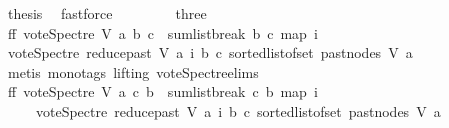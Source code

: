 \begin{isabellebody}
\ {\isacharquery}{\kern0pt}thesis\ \isamarkupfalse%
\ fastforce\isanewline
\ \ \isamarkupfalse%
\isanewline
\ \ \ \ \isamarkupfalse%
\ three\isanewline
\ \ \ \ \isamarkupfalse%
\ \isamarkupfalse%
\ ff{\isacharcolon}{\kern0pt}\ {\isachardoublequoteopen}vote{\isacharunderscore}{\kern0pt}Spectre\ V\ a\ b\ c\ {\isacharequal}{\kern0pt}\ {\isacharparenleft}{\kern0pt}sumlist{\isacharunderscore}{\kern0pt}break\ b\ c\ {\isacharparenleft}{\kern0pt}map\ {\isacharparenleft}{\kern0pt}{\isasymlambda}i{\isachardot}{\kern0pt}\isanewline
\ {\isacharparenleft}{\kern0pt}vote{\isacharunderscore}{\kern0pt}Spectre\ {\isacharparenleft}{\kern0pt}reduce{\isacharunderscore}{\kern0pt}past\ V\ a{\isacharparenright}{\kern0pt}\ i\ b\ c{\isacharparenright}{\kern0pt}{\isacharparenright}{\kern0pt}\ {\isacharparenleft}{\kern0pt}sorted{\isacharunderscore}{\kern0pt}list{\isacharunderscore}{\kern0pt}of{\isacharunderscore}{\kern0pt}set\ {\isacharparenleft}{\kern0pt}past{\isacharunderscore}{\kern0pt}nodes\ V\ a{\isacharparenright}{\kern0pt}{\isacharparenright}{\kern0pt}{\isacharparenright}{\kern0pt}{\isacharparenright}{\kern0pt}{\isachardoublequoteclose}\isanewline
\ \ \ \ \ \ \isamarkupfalse%
\ {\isacharparenleft}{\kern0pt}metis\ {\isacharparenleft}{\kern0pt}mono{\isacharunderscore}{\kern0pt}tags{\isacharcomma}{\kern0pt}\ lifting{\isacharparenright}{\kern0pt}\ vote{\isacharunderscore}{\kern0pt}Spectre{\isachardot}{\kern0pt}elims{\isacharparenright}{\kern0pt}\ \isanewline
\ \ \ \ \isamarkupfalse%
\ ff{}{\isacharcolon}{\kern0pt}\ {\isachardoublequoteopen}vote{\isacharunderscore}{\kern0pt}Spectre\ V\ a\ c\ b\ {\isacharequal}{\kern0pt}\ {\isacharparenleft}{\kern0pt}sumlist{\isacharunderscore}{\kern0pt}break\ c\ b\ {\isacharparenleft}{\kern0pt}map\ {\isacharparenleft}{\kern0pt}{\isasymlambda}i{\isachardot}{\kern0pt}\isanewline
\ \ \ \ {\isacharparenleft}{\kern0pt}{\isacharminus}{\kern0pt}\ vote{\isacharunderscore}{\kern0pt}Spectre\ {\isacharparenleft}{\kern0pt}reduce{\isacharunderscore}{\kern0pt}past\ V\ a{\isacharparenright}{\kern0pt}\ i\ b\ c{\isacharparenright}{\kern0pt}{\isacharparenright}{\kern0pt}\ {\isacharparenleft}{\kern0pt}sorted{\isacharunderscore}{\kern0pt}list{\isacharunderscore}{\kern0pt}of{\isacharunderscore}{\kern0pt}set\ {\isacharparenleft}{\kern0pt}past{\isacharunderscore}{\kern0pt}nodes\ V\ a{\isacharparenright}{\kern0pt}{\isacharparenright}{\kern0pt}{\isacharparenright}{\kern0pt}{\isacharparenright}{\kern0pt}{\isachardoublequoteclose}\ \isanewline
\ \ \ \ \ \ \ \isamarkupfalse%

\end{isabellebody}
